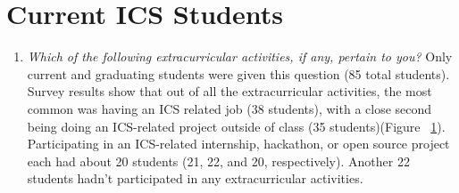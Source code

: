 \section{Current ICS Students}
\begin{enumerate}
\begin{figure}[h]
\centering
\texttt{[image: sr-extracurric-bar]}
\caption{Results for extracurricular participation by event type \textit{N=85}}
\label{extracurricular}
\end{figure}

\begin{figure}[h]
\centering
\texttt{[image: sr-extracurric-pie]}
\caption{Results for extracurricular participation by amount of participation (all current and graduating students). \textit{N=85}}
\label{extracurricular-pie-all}
\end{figure}

\begin{figure}[h]
\centering
\texttt{[image: sr-extracurric-pie-midgrad]}
\caption{Results for extracurricular participation by amount of participation (only students who have completed 5+ ICS courses) \textit{N=41}}
\label{extracurricular-pie-mid-grad}
\end{figure}
\item \textit{Which of the following extracurricular activities, if any, pertain to you?}
Only current and graduating students were given this question (85 total students). Survey results show that out of all the extracurricular activities, the most common was having an ICS related job (38 students), with a close second being doing an ICS-related project outside of class (35 students)(Figure ~\ref{extracurricular}). Participating in an ICS-related internship, hackathon, or open source project each had about 20 students (21, 22, and 20, respectively). Another 22 students hadn't participated in any extracurricular activities. 


\end{enumerate}
